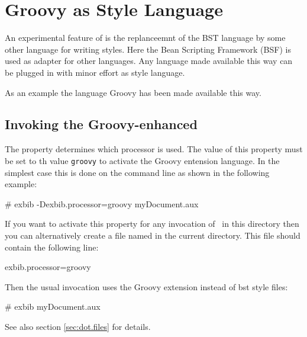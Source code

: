 
\section{Groovy as Style Language}

An experimental feature of \ExBib{} is the replanceemnt of the BST
language by some other language for writing styles. Here the Bean
Scripting Framework (BSF) is used as adapter for other languages. Any
language made available this way can be plugged in with minor effort
as style language.

As an example the language Groovy has been made available this way.


\subsection{Invoking the Groovy-enhanced \ExBib}

The property  determines which processor is
used. The value of this property must be set to th value \verb|groovy|
to activate the Groovy entension language. In the simplest case this
is done on the command line as shown in the following example:

\begin{listings}[language=sh]
# exbib -Dexbib.processor=groovy myDocument.aux
\end{listings}

If you want to activate this property for any invocation of \ExBib\ in
this directory then you can alternatively create a file named
 in the current directory. This file should contain the
following line:

\begin{listings}
exbib.processor=groovy
\end{listings}

Then the usual invocation uses the Groovy extension instead of bst
style files:

\begin{listings}[language=sh]
# exbib myDocument.aux
\end{listings}

See also section \ref{sec:dot.files} for details.


